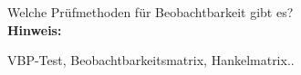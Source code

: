 \begin{question}[section=7,name={Prüfmethoden für Beobachtbarkeit},difficulty=,type=mdl,tags={}]
	Welche Prüfmethoden für Beobachtbarkeit gibt es?
	\\ \textbf{Hinweis:}\\
	
\end{question}
\begin{solution}
	VBP-Test, Beobachtbarkeitsmatrix, Hankelmatrix..
\end{solution}